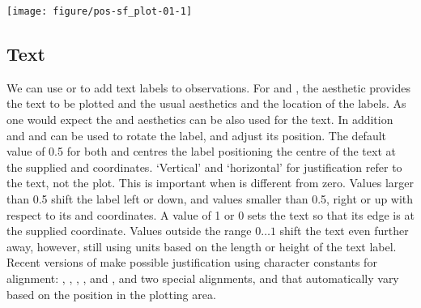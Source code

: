 \documentclass[krantz2]{krantz}\usepackage{knitr}%
\begin{document}
\begin{knitrout}\footnotesize
{}\color{fgcolor}\begin{kframe}
\begin{alltt}
 \hlkwb{<-} \hlopt{::}\hlstd{(}\hlstd{(}\hlstd{,}  \hlstd{=} \hlstd{),}  \hlstd{=} \hlstd{)}
 \hlopt{+}
  \hlstd{(}\hlstd{(}   \hlstd{=} \hlstd{)}
\end{alltt}
\end{kframe}

{\centering \texttt{[image: figure/pos-sf\_plot-01-1]} 

}



\end{knitrout}

\subsection{Text}\label{sec:plot:text}
We can use  or  to add text labels to observations. For  and , the aesthetic  provides the text to be plotted and the usual aesthetics  and  the location of the labels. As one would expect the  and  aesthetics can be also used for the text. In addition  and  and  can be used to rotate the label, and adjust its position. The default value of 0.5 for both  and  centres the label positioning the centre of the text at the supplied  and  coordinates. `Vertical' and `horizontal' for justification refer to the text, not the plot. This is important when  is different from zero. Values larger than 0.5 shift the label left or down, and values smaller than 0.5, right or up with respect to its  and  coordinates. A value of 1 or 0 sets the text so that its edge is at the supplied coordinate. Values outside the range $0\ldots 1$ shift the text even further away, however, still using units based on the length or height of the text label. Recent versions of  make possible justification using character constants for alignment: , , , ,  and , and two special alignments,  and  that automatically vary based on the position in the plotting area.
\end{document}
